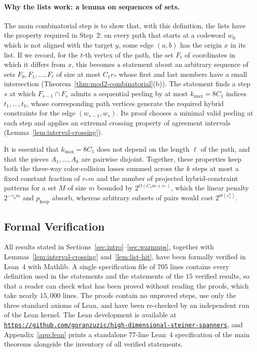 \documentclass[11pt]{article}
\theoremstyle{definition}
\theoremstyle{remark}
\begin{document}
\paragraph{Why the lists work: a lemma on sequences of sets.}
The main combinatorial step is to show that, with this definition, the lists have the property required in Step~2: on every path that starts at a codeword $w_0$ which is not aligned with the target $y$, some edge $(a, b)$ has the origin $x$ in its list. If we record, for the $t$-th vertex of the path, the set $F_t$ of coordinates in which it differs from $x$, this becomes a statement about an arbitrary sequence of sets $F_0, F_1, \dots, F_\ell$ of size at most $C_1 r_*$ whose first and last members have a small intersection (Theorem~\ref{thm:mod2-combinatorial}(b)). The statement finds a step $s$ at which $F_{s-1} \cap F_s$ admits a sequential peeling by at most $k_{\max} = 8 C_1$ indices $t_1, \dots, t_k$, whose corresponding path vertices generate the required hybrid constraints for the edge $(w_{s-1}, w_s)$. Its proof chooses a minimal valid peeling at each step and applies an extremal crossing property of agreement intervals (Lemma~\ref{lem:interval-crossing}).

It is essential that $k_{\max} = 8 C_1$ does not depend on the length $\ell$ of the path, and that the pieces $A_1, \dots, A_k$ are pairwise disjoint. Together, these properties keep both the three-way color-collision losses summed across the $k$ steps at most a fixed constant fraction of $r_* m$ and the number of projected hybrid-constraint patterns for a set $M$ of size $m$ bounded by $2^{O(C_1 m + r_*)}$, which the linear penalty $2^{-\gamma_0 m}$ and $p_{\mathrm{keep}}$ absorb, whereas arbitrary subsets of pairs would cost $2^{\Theta(r_*^2)}$.

\subsection{Formal Verification}
\label{subsec:lean}

All results stated in Sections~\ref{sec:intro}--\ref{sec:warmups}, together with Lemmas~\ref{lem:interval-crossing} and~\ref{lem:list-hit}, have been formally verified in Lean~4 with Mathlib. A single specification file of $705$ lines contains every definition used in the statements and the statements of the $15$ verified results, so that a reader can check what has been proved without reading the proofs, which take nearly $15{,}000$ lines. The proofs contain no unproved steps, use only the three standard axioms of Lean, and have been re-checked by an independent run of the Lean kernel. The Lean development is available at \href{https://github.com/goranzuzic/high-dimensional-steiner-spanners}{\texttt{https://github.com/\allowbreak goranzuzic/\allowbreak high-\allowbreak dimensional-\allowbreak steiner-\allowbreak spanners}}, and Appendix~\ref{app:lean} prints a standalone $77$-line Lean~4 specification of the main theorems alongside the inventory of all verified statements.
\end{document}
